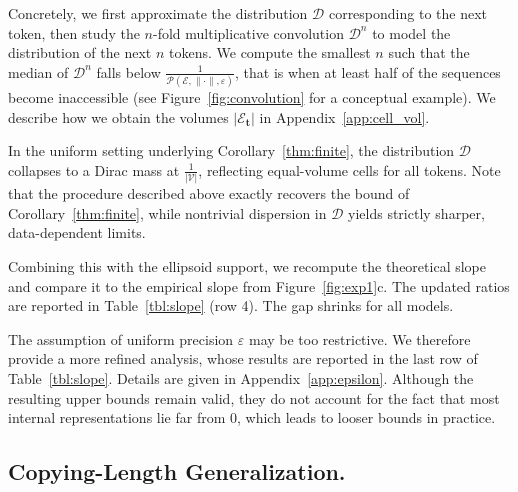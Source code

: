 Concretely, we first approximate the distribution $\mathcal D$ corresponding to the next token, then study the $n$-fold multiplicative convolution $\mathcal D^{n}$ to model the distribution of the next $n$ tokens. We compute the smallest $n$ such that the median of $\mathcal D^{n}$ falls below $\frac1{\mathcal{P}(\mathcal E,\|\cdot\|,\varepsilon)}$, that is when at least half of the sequences become inaccessible (see Figure~\ref{fig:convolution} for a conceptual example). We describe how we obtain the volumes $\lvert \mathcal{E}_{\mathbf t} \rvert$ in Appendix~\ref{app:cell_vol}.

\begin{remark}
    In the uniform setting underlying Corollary~\ref{thm:finite}, the distribution $\mathcal D$ collapses to a Dirac mass at $\frac{1}{ \lvert \mathcal V \rvert}$, reflecting equal-volume cells for all tokens.
    Note that the procedure described above exactly recovers the bound of Corollary~\ref{thm:finite}, while nontrivial dispersion in $\mathcal D$ yields strictly sharper, data-dependent limits.
\end{remark}

Combining this with the ellipsoid support, we recompute the theoretical slope and compare it to the empirical slope from Figure~\ref{fig:exp1}c. The updated ratios are reported in Table~\ref{tbl:slope} (row 4). The gap shrinks for all models.

\begin{remark}
    The assumption of uniform precision $\varepsilon$ may be too restrictive. We therefore provide a more refined analysis, whose results are reported in the last row of Table~\ref{tbl:slope}. Details are given in Appendix~\ref{app:epsilon}. Although the resulting upper bounds remain valid, they do not account for the fact that most internal representations lie far from $0$, which leads to looser bounds in practice.
\end{remark}

\subsection{Copying-Length Generalization.}



